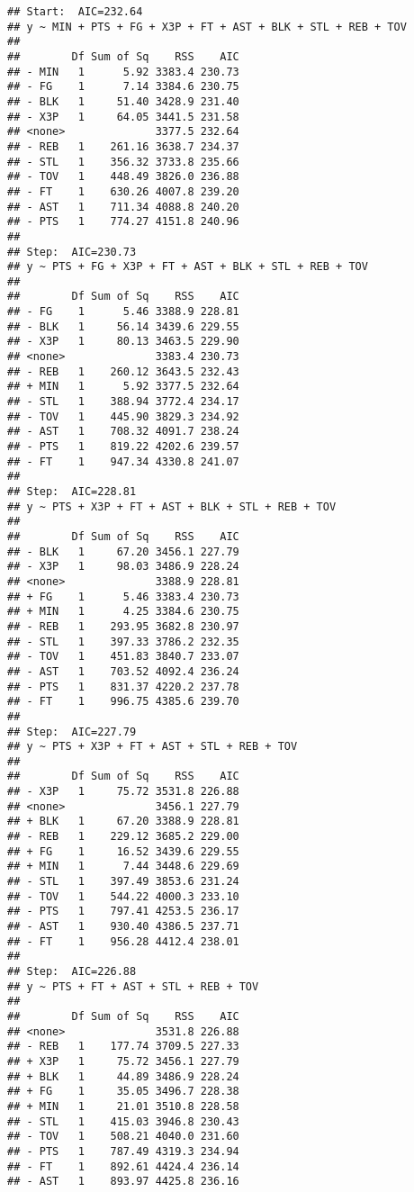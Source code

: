 \documentclass[
]{article}
\begin{document}
\begin{verbatim}
## Start:  AIC=232.64
## y ~ MIN + PTS + FG + X3P + FT + AST + BLK + STL + REB + TOV
## 
##        Df Sum of Sq    RSS    AIC
## - MIN   1      5.92 3383.4 230.73
## - FG    1      7.14 3384.6 230.75
## - BLK   1     51.40 3428.9 231.40
## - X3P   1     64.05 3441.5 231.58
## <none>              3377.5 232.64
## - REB   1    261.16 3638.7 234.37
## - STL   1    356.32 3733.8 235.66
## - TOV   1    448.49 3826.0 236.88
## - FT    1    630.26 4007.8 239.20
## - AST   1    711.34 4088.8 240.20
## - PTS   1    774.27 4151.8 240.96
## 
## Step:  AIC=230.73
## y ~ PTS + FG + X3P + FT + AST + BLK + STL + REB + TOV
## 
##        Df Sum of Sq    RSS    AIC
## - FG    1      5.46 3388.9 228.81
## - BLK   1     56.14 3439.6 229.55
## - X3P   1     80.13 3463.5 229.90
## <none>              3383.4 230.73
## - REB   1    260.12 3643.5 232.43
## + MIN   1      5.92 3377.5 232.64
## - STL   1    388.94 3772.4 234.17
## - TOV   1    445.90 3829.3 234.92
## - AST   1    708.32 4091.7 238.24
## - PTS   1    819.22 4202.6 239.57
## - FT    1    947.34 4330.8 241.07
## 
## Step:  AIC=228.81
## y ~ PTS + X3P + FT + AST + BLK + STL + REB + TOV
## 
##        Df Sum of Sq    RSS    AIC
## - BLK   1     67.20 3456.1 227.79
## - X3P   1     98.03 3486.9 228.24
## <none>              3388.9 228.81
## + FG    1      5.46 3383.4 230.73
## + MIN   1      4.25 3384.6 230.75
## - REB   1    293.95 3682.8 230.97
## - STL   1    397.33 3786.2 232.35
## - TOV   1    451.83 3840.7 233.07
## - AST   1    703.52 4092.4 236.24
## - PTS   1    831.37 4220.2 237.78
## - FT    1    996.75 4385.6 239.70
## 
## Step:  AIC=227.79
## y ~ PTS + X3P + FT + AST + STL + REB + TOV
## 
##        Df Sum of Sq    RSS    AIC
## - X3P   1     75.72 3531.8 226.88
## <none>              3456.1 227.79
## + BLK   1     67.20 3388.9 228.81
## - REB   1    229.12 3685.2 229.00
## + FG    1     16.52 3439.6 229.55
## + MIN   1      7.44 3448.6 229.69
## - STL   1    397.49 3853.6 231.24
## - TOV   1    544.22 4000.3 233.10
## - PTS   1    797.41 4253.5 236.17
## - AST   1    930.40 4386.5 237.71
## - FT    1    956.28 4412.4 238.01
## 
## Step:  AIC=226.88
## y ~ PTS + FT + AST + STL + REB + TOV
## 
##        Df Sum of Sq    RSS    AIC
## <none>              3531.8 226.88
## - REB   1    177.74 3709.5 227.33
## + X3P   1     75.72 3456.1 227.79
## + BLK   1     44.89 3486.9 228.24
## + FG    1     35.05 3496.7 228.38
## + MIN   1     21.01 3510.8 228.58
## - STL   1    415.03 3946.8 230.43
## - TOV   1    508.21 4040.0 231.60
## - PTS   1    787.49 4319.3 234.94
## - FT    1    892.61 4424.4 236.14
## - AST   1    893.97 4425.8 236.16
\end{verbatim}
\end{document}
